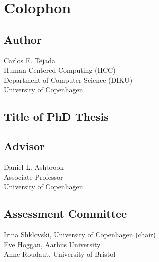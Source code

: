 \pagestyle{empty}


\section*{Colophon}
	\bigskip

	\noindent
	
	\subsection*{Author}
	Carlos E. Tejada\\
	Human-Centered Computing (HCC)\\
	Department of Computer Science (DIKU)\\
	University of Copenhagen
	
	\subsection*{Title of PhD Thesis}
	\myTitle \mySubtitle
	
	\subsection*{Advisor}
	Daniel L. Ashbrook\\
	Associate Professor\\
	University of Copenhagen
	
	\subsection*{Assessment Committee}
	Irina Shklovski, University of Copenhagen (chair)\\
	Eve Hoggan, Aarhus University\\
	Anne Roudaut, University of Bristol